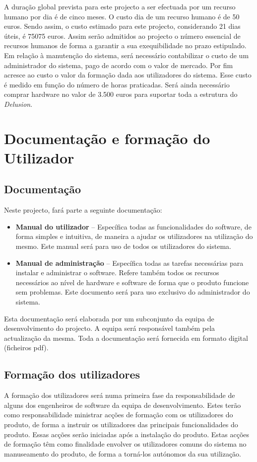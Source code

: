 A duração global prevista para este projecto a ser efectuada por um recurso humano por dia é de cinco meses. O custo dia de um recurso humano é de 50 euros. Sendo assim, o custo estimado para este projecto, considerando 21 dias úteis, é 75075 euros. Assim serão admitidos ao projecto o número essencial de recursos humanos de forma a garantir a sua exequibilidade no prazo estipulado. 
Em relação à manutenção do sistema, será necessário contabilizar o custo de um administrador do sistema, pago de acordo com o valor de mercado.
Por fim acresce ao custo o valor da formação dada aos utilizadores do sistema. Esse custo é medido em função do número de horas praticadas.
Será ainda necessário comprar hardware no valor de 3.500 euros para suportar toda a estrutura do \textit{Delusion}.

\section{Documentação e formação do Utilizador}
\subsection{Documentação}
Neste projecto, fará parte a seguinte documentação:

\begin{itemize}
\item \textbf{Manual do utilizador} – Específica todas as funcionalidades do software, de forma simples e intuitiva, de maneira a ajudar os utilizadores na utilização do mesmo. Este manual será para uso de todos os utilizadores do sistema.

\item \textbf{Manual de administração} – Específica todas as tarefas necessárias para instalar e administrar o software. Refere também todos os recursos necessários ao nível de hardware e software de forma que o produto funcione sem problemas. Este documento será para uso exclusivo do administrador do sistema.
\end{itemize}

Esta documentação será elaborada por um subconjunto da equipa de desenvolvimento do projecto. A equipa será responsável também pela actualização da mesma. Toda a documentação será fornecida em formato digital (ficheiros pdf). 

\subsection{Formação dos utilizadores}
A formação dos utilizadores será numa primeira fase da responsabilidade de alguns dos engenheiros de software da equipa de desenvolvimento. Estes terão como responsabilidade ministrar acções de formação com os utilizadores do produto, de forma a instruir os utilizadores das principais funcionalidades do produto. Essas acções serão iniciadas após a instalação do produto. Estas acções de formação têm como finalidade envolver os utilizadores comuns do sistema no manuseamento do produto, de forma a torná-los autónomos da sua utilização.
